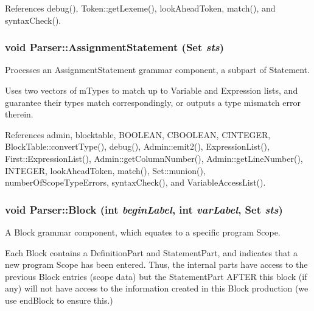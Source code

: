 References debug(), Token::getLexeme(), lookAheadToken, match(), and syntaxCheck().

\hypertarget{classParser_a472a0dc9ed06ffc3ec260992ae7197ca}{
\subsubsection[{AssignmentStatement}]{\setlength{\rightskip}{0pt plus 5cm}void Parser::AssignmentStatement ({\bf Set} {\em sts})}}
\label{classParser_a472a0dc9ed06ffc3ec260992ae7197ca}


Processes an AssignmentStatement grammar component, a subpart of Statement. 

Uses two vectors of mTypes to match up to Variable and Expression lists, and guarantee their types match correspondingly, or outputs a type mismatch error therein. 

References admin, blocktable, BOOLEAN, CBOOLEAN, CINTEGER, BlockTable::convertType(), debug(), Admin::emit2(), ExpressionList(), First::ExpressionList(), Admin::getColumnNumber(), Admin::getLineNumber(), INTEGER, lookAheadToken, match(), Set::munion(), numberOfScopeTypeErrors, syntaxCheck(), and VariableAccessList().

\hypertarget{classParser_a229a836b6e6d8dce8826647fb430d99d}{
\subsubsection[{Block}]{\setlength{\rightskip}{0pt plus 5cm}void Parser::Block (int {\em beginLabel}, \/  int {\em varLabel}, \/  {\bf Set} {\em sts})}}
\label{classParser_a229a836b6e6d8dce8826647fb430d99d}


A Block grammar component, which equates to a specific program Scope. 

Each Block contains a DefinitionPart and StatementPart, and indicates that a new program Scope has been entered. Thus, the internal parts have access to the previous Block entries (scope data) but the StatementPart AFTER this block (if any) will not have access to the information created in this Block production (we use endBlock to ensure this.) 

